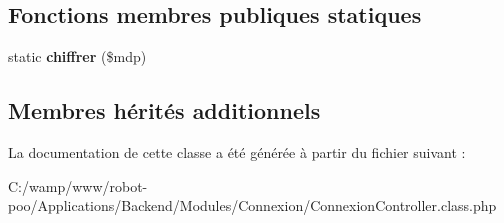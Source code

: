 \subsection*{Fonctions membres publiques statiques}
\begin{DoxyCompactItemize}
\item 
\hypertarget{class_applications_1_1_backend_1_1_modules_1_1_connexion_1_1_connexion_controller_a6507860389719ba17d2af29396250380}{static {\bfseries chiffrer} (\$mdp)}\label{class_applications_1_1_backend_1_1_modules_1_1_connexion_1_1_connexion_controller_a6507860389719ba17d2af29396250380}

\end{DoxyCompactItemize}
\subsection*{Membres hérités additionnels}


La documentation de cette classe a été générée à partir du fichier suivant \+:\begin{DoxyCompactItemize}
\item 
C\+:/wamp/www/robot-\/poo/\+Applications/\+Backend/\+Modules/\+Connexion/Connexion\+Controller.\+class.\+php\end{DoxyCompactItemize}

